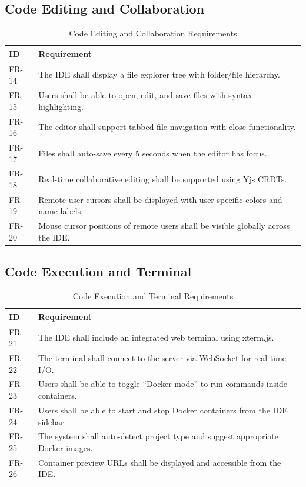 \documentclass[12pt,a4paper,oneside]{report}
\begin{document}
\subsection{Code Editing and Collaboration}

\begin{table}[H]
\centering
\caption{Code Editing and Collaboration Requirements}
\label{tab:editor-req}
\begin{tabularx}{\textwidth}{lX}
\toprule
\textbf{ID} & \textbf{Requirement} \\
\midrule
FR-14 & The IDE shall display a file explorer tree with folder/file hierarchy. \\
FR-15 & Users shall be able to open, edit, and save files with syntax highlighting. \\
FR-16 & The editor shall support tabbed file navigation with close functionality. \\
FR-17 & Files shall auto-save every 5 seconds when the editor has focus. \\
FR-18 & Real-time collaborative editing shall be supported using Yjs CRDTs. \\
FR-19 & Remote user cursors shall be displayed with user-specific colors and name labels. \\
FR-20 & Mouse cursor positions of remote users shall be visible globally across the IDE. \\
\bottomrule
\end{tabularx}
\end{table}

\subsection{Code Execution and Terminal}

\begin{table}[H]
\centering
\caption{Code Execution and Terminal Requirements}
\label{tab:exec-req}
\begin{tabularx}{\textwidth}{lX}
\toprule
\textbf{ID} & \textbf{Requirement} \\
\midrule
FR-21 & The IDE shall include an integrated web terminal using xterm.js. \\
FR-22 & The terminal shall connect to the server via WebSocket for real-time I/O. \\
FR-23 & Users shall be able to toggle ``Docker mode'' to run commands inside containers. \\
FR-24 & Users shall be able to start and stop Docker containers from the IDE sidebar. \\
FR-25 & The system shall auto-detect project type and suggest appropriate Docker images. \\
FR-26 & Container preview URLs shall be displayed and accessible from the IDE. \\
\bottomrule
\end{tabularx}
\end{table}
\end{document}
